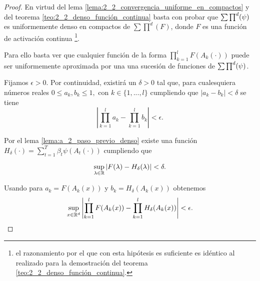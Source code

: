 \begin{proof}
    En virtud del lema \ref{lema:2_2_convergencia_uniforme_en_compactos} y del 
    teorema \ref{teo:2_2_denso_función_continua} basta con probar que 
    $\sum \prod^d (\psi)$ es uniformemente denso en compactos de $\sum \prod^d(F)$, 
    donde $F$ es una función de activación continua 
    \footnote{el razonamiento 
    por el que con esta hipótesis es suficiente es idéntico al realizado para la 
    demostración del teorema \ref{teo:2_2_denso_función_continua}.}.

    Para ello basta ver que cualquier función de la forma $\prod_{k=1}^l F(A_k(\cdot))$
    puede ser uniformemente aproximada por una una sucesión de funciones de $\sum \prod^d (\psi)$.

    Fijamos $\epsilon > 0$. 
    Por continuidad, existirá un $\delta >0$
    tal que, para cualesquiera números reales $0 \leq a_k, b_k \leq 1,$ con $k \in \{1,...,l\}$ 
    cumpliendo que $|a_k -b_k| < \delta$ se tiene
    \begin{equation} \label{eq:teorema_2_3__1}
        \left| 
            \prod^l_{k=1} a_k - \prod^l_{k=1} b_k 
        \right| 
        < 
        \epsilon.
    \end{equation}

    Por el lema \ref{lema:a_2_paso_previo_denso} existe una función 
    $H_{\delta}(\cdot) = \sum_{t=1}^T \beta_t \psi(A_t(\cdot))$
    cumpliendo que 

    \begin{equation}
        \sup_{\lambda \in \mathbb{R}} |F(\lambda) - H_{\delta}(\lambda) | < \delta.
    \end{equation}

    Usando  para 
    $a_k = F(A_k(x))$ y $b_k = H_\delta(A_k(x))$
    obtenemos
    \begin{equation}\label{eq:teorema2_3__3}
        \sup_{x \in \mathbb{R}^d} 
        \left| 
            \prod ^l_{k=1} F(A_k(x))
            -
            \prod ^l_{k=1} H_\delta(A_k(x))
        \right| 
        < 
        \epsilon.
    \end{equation} 
    

\end{proof}
